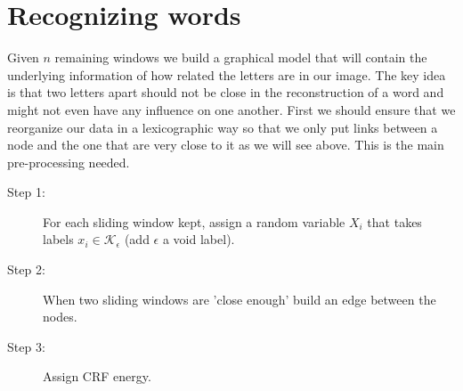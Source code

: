 \documentclass[10pt,a4paper]{article}
\begin{document}
\section{Recognizing words}

Given $n$ remaining windows we build a graphical model that will contain the underlying information of how related the letters are in our image. The key idea is that two letters apart should not be close in the reconstruction of a word and might not even have any influence on one another. First we should ensure that we reorganize our data in a lexicographic way so that we only put links between a node and the one that are very close to it as we will see above. This is the main pre-processing needed. 
\begin{description}
\item[Step 1: ] For each sliding window kept, assign a random variable $X_i$ that takes labels $x_i \in \mathcal{K}_{\epsilon}$ (add $\epsilon$ a void label).
\item[Step 2: ] When two sliding windows are 'close enough' build an edge between the nodes.
\item[Step 3: ] Assign CRF energy.
\end{description}
\end{document}
